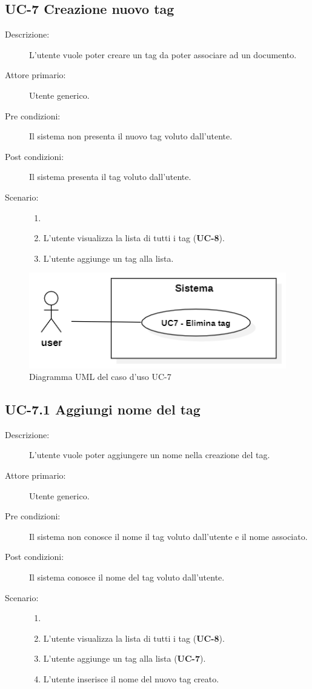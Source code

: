 \subsection{UC-7 Creazione nuovo tag}
\begin{description}
    \item[Descrizione:] L’utente vuole poter creare un tag da poter associare ad un documento.
    \item[Attore primario:] Utente generico.
    \item[Pre condizioni:] Il sistema non presenta il nuovo tag voluto dall’utente.
    \item[Post condizioni:] Il sistema presenta il tag voluto dall’utente.
    \item[Scenario:]
    \begin{enumerate}
        \item[]
        \item L’utente visualizza la lista di tutti i tag (\textbf{UC-8}).
        \item L'utente aggiunge un tag alla lista.
    \end{enumerate}
\end{description}

\begin{figure}[H]
    \centering
    \includegraphics[width=0.8\linewidth]{UC7.png} %
    \caption{Diagramma UML del caso d'uso UC-7}
    \label{fig:UC7}
\end{figure}

\subsection{UC-7.1 Aggiungi nome del tag}
\begin{description}
    \item[Descrizione:] L’utente vuole poter aggiungere un nome nella creazione del tag.
    \item[Attore primario:] Utente generico.
    \item[Pre condizioni:] Il sistema non conosce il nome  il tag voluto dall’utente e il nome associato.
    \item[Post condizioni:] Il sistema conosce il nome del tag voluto dall’utente.
    \item[Scenario:]
    \begin{enumerate}
        \item[]
        \item L’utente visualizza la lista di tutti i tag (\textbf{UC-8}).
        \item L'utente aggiunge un tag alla lista (\textbf{UC-7}).
        \item L'utente inserisce il nome del nuovo tag creato.
    \end{enumerate}
\end{description}

